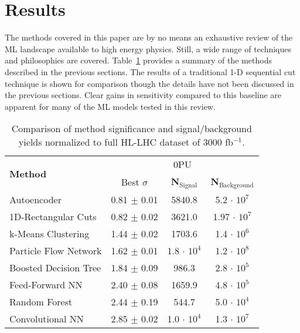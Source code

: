 \section{Results}
\label{sec:results}

The methods covered in this paper are by no means an exhaustive review of the ML landscape available to high energy physics. Still, a wide range of techniques and philosophies are covered. Table~\ref{tab:summary} provides a summary of the methods described in the previous sections. The results of a traditional 1-D sequential cut technique is shown for comparison though the details have not been discussed in the previous sections. Clear gains in sensitivity compared to this baseline are apparent for many of the ML models tested in this review.

\begin{table}[h!]
\label{tab:summary}
  \begin{center}
  \begin{tabular}{|l|c|c|c|} %
      \hline\hline
      \multirow{2}{*}{\textbf{Method}} & \multicolumn{3}{c|}{0PU} \\
      \cline{2-4}
      & Best $\sigma$ & \textbf{N$_{\mathrm{Signal}}$} & \textbf{N$_{\mathrm{Background}}$} \\
      \hline
      Autoencoder           & 0.81 $\pm$ 0.01 & 5840.8 & 5.2 $\cdot$ $10^7$ \\
      1D-Rectangular Cuts   & 0.82 $\pm$ 0.02 & 3621.0 & 1.97 $\cdot$ $10^7$ \\
      k-Means Clustering    & 1.44 $\pm$ 0.02 & 1703.6 & 1.4 $\cdot$ $10^6$ \\
      Particle Flow Network & 1.62 $\pm$ 0.01 & 1.8 $\cdot$ $10^4$ & 1.2 $\cdot$ $10^8$ \\
      Boosted Decision Tree & 1.84 $\pm$ 0.09 & 986.3  & 2.8 $\cdot$ $10^5$ \\
      Feed-Forward NN       & 2.40 $\pm$ 0.08 & 1659.9 & 4.8 $\cdot$ $10^5$ \\
      Random Forest         & 2.44 $\pm$ 0.19 & 544.7 & 5.0 $\cdot$ $10^4$ \\
      Convolutional NN      & 2.85 $\pm$ 0.02 & 1.0 $\cdot$ $10^4$ & 1.3 $\cdot$ $10^7$ \\
      \hline\hline
    \end{tabular}
    \caption{Comparison of method significance and signal/background yields normalized to full HL-LHC dataset of 3000 fb$^{-1}$.}
  \end{center}
\end{table}

